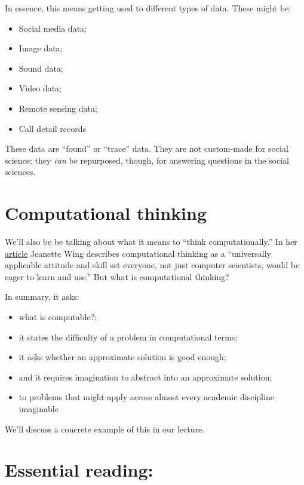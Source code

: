 \documentclass[
  letterpaper,
  DIV=11,
  numbers=noendperiod]{scrreprt}
\providecommand{\tightlist}{%
  \setlength{\itemsep}{0pt}\setlength{\parskip}{0pt}}\usepackage{longtable,booktabs,array}
\begin{document}
In essence, this means getting used to different types of data. These
might be:

\begin{itemize}
\tightlist
\item
  Social media data;
\item
  Image data;
\item
  Sound data;
\item
  Video data;
\item
  Remote sensing data;
\item
  Call detail records
\end{itemize}

These data are ``found'' or ``trace'' data. They are not custom-made for
social science; they \emph{can} be repurposed, though, for answering
questions in the social sciences.

\hypertarget{computational-thinking}{%
\section{Computational thinking}\label{computational-thinking}}

We'll also be be talking about what it means to ``think
computationally.'' In her
\href{http://www.cs.cmu.edu/afs/cs/usr/wing/www/publications/Wing06.pdf}{article}
Jeanette Wing describes computational thinking as a ``universally
applicable attitude and skill set everyone, not just computer
scientists, would be eager to learn and use.'' But what is computational
thinking?

In summary, it asks:

\begin{itemize}
\tightlist
\item
  what is computable?;
\item
  it states the difficulty of a problem in computational terms;
\item
  it asks whether an approximate solution is good enough;
\item
  and it requires imagination to abstract into an approximate solution;
\item
  to problems that might apply across almost every academic discipline
  imaginable
\end{itemize}

We'll discuss a concrete example of this in our lecture.

\hypertarget{essential-reading}{%
\section{Essential reading:}\label{essential-reading}}
\end{document}
